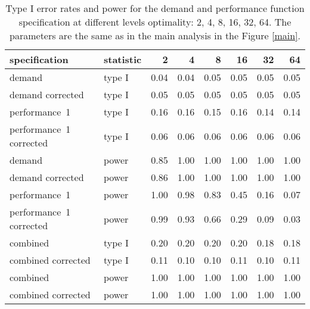 \begin{table}[ht]
\centering
\begingroup\footnotesize
\begin{tabular}{llrrrrrr}
  \hline
specification & statistic & 2 & 4 & 8 & 16 & 32 & 64 \\ 
  \hline
demand & type I & 0.04 & 0.04 & 0.05 & 0.05 & 0.05 & 0.05 \\ 
  demand corrected & type I & 0.05 & 0.05 & 0.05 & 0.05 & 0.05 & 0.05 \\ 
  performance~1 & type I & 0.16 & 0.16 & 0.15 & 0.16 & 0.14 & 0.14 \\ 
  performance~1 corrected & type I & 0.06 & 0.06 & 0.06 & 0.06 & 0.06 & 0.06 \\ 
  demand & power & 0.85 & 1.00 & 1.00 & 1.00 & 1.00 & 1.00 \\ 
  demand corrected & power & 0.86 & 1.00 & 1.00 & 1.00 & 1.00 & 1.00 \\ 
  performance~1 & power & 1.00 & 0.98 & 0.83 & 0.45 & 0.16 & 0.07 \\ 
  performance~1 corrected & power & 0.99 & 0.93 & 0.66 & 0.29 & 0.09 & 0.03 \\ 
  combined & type I & 0.20 & 0.20 & 0.20 & 0.20 & 0.18 & 0.18 \\ 
  combined corrected & type I & 0.11 & 0.10 & 0.10 & 0.11 & 0.10 & 0.11 \\ 
  combined & power & 1.00 & 1.00 & 1.00 & 1.00 & 1.00 & 1.00 \\ 
  combined corrected & power & 1.00 & 1.00 & 1.00 & 1.00 & 1.00 & 1.00 \\ 
   \hline
\end{tabular}
\endgroup
\caption{Type I error rates and power for the demand and
  performance function specification at different levels optimality:
  2, 4, 8, 16, 32, 64. The parameters are the same as in the main 
  analysis in the Figure \ref{main}.} 
\label{nearly-table}
\end{table}
